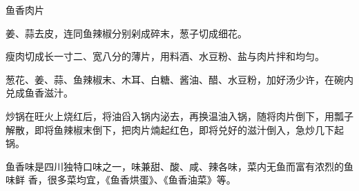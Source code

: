 \begin{recipe}{鱼香肉片}

\ingredients


\cooking

\step 姜、蒜去皮，连同鱼辣椒分别剁成碎末，葱子切成细花。

\step 瘦肉切成长一寸二、宽八分的薄片，用料酒、水豆粉、盐与肉片拌和均匀。

\step 葱花、姜、蒜、鱼辣椒末、木耳、白糖、酱油、醋、水豆粉，加好汤少许，在碗内
兑成鱼香滋汁。

\step 炒锅在旺火上烧红后，将油舀入锅内泌去，再换温油入锅，随将肉片倒下，用瓢子
解散，即将鱼辣椒末倒下，把肉片煵起红色，即将兑好的滋汁倒入，急炒几下起锅。

\notes

鱼香味是四川独特口味之一，味兼甜、酸、咸、辣各味，菜内无鱼而富有浓烈的鱼味鲜
香，很多菜均宜，《鱼香烘蛋》、《鱼香油菜》等。

\end{recipe}

